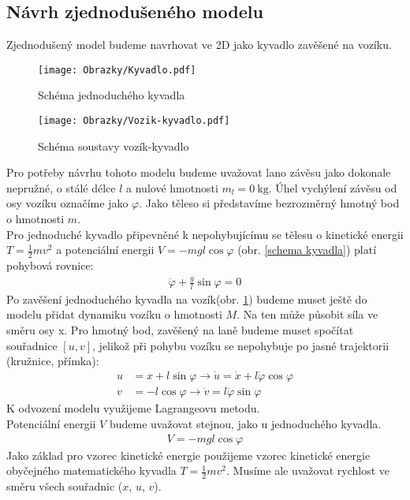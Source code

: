 \documentclass[a4paper, 12pt]{article}
\begin{document}
		\subsection{Návrh zjednodušeného modelu}		
			Zjednodušený model budeme navrhovat ve 2D jako kyvadlo zavěšené na vozíku.
			\begin{wrapfigure}{r}{0pt}
				\texttt{[image: Obrazky/Kyvadlo.pdf]}
				\caption{Schéma jednoduchého kyvadla}
				\label{schema kyvadla}
				\texttt{[image: Obrazky/Vozik-kyvadlo.pdf]}
				\caption{Schéma soustavy vozík-kyvadlo}
				\label{schema vozik-kyvadlo}
			\end{wrapfigure}
			Pro potřeby návrhu tohoto modelu budeme uvažovat lano závěsu jako dokonale nepružné, o stálé délce $l$ a nulové hmotnosti $m_l = \SI{0}{\kilogram}$. Úhel vychýlení závěsu od osy vozíku označíme jako $\varphi$. Jako těleso si představíme bezrozměrný hmotný bod o hmotnosti $m$.\\
			Pro jednoduché kyvadlo připevněné k nepohybujícímu se tělesu o kinetické energii $T = \frac{1}{2}mv^2$ a potenciální energii $V = -mgl\cos\varphi$ (obr. \ref{schema kyvadla}) platí pohybová rovnice:
			\begin{align*}
				\ddot{\varphi}+\frac{g}{l}\sin\varphi=0
			\end{align*}
			Po zavěšení jednoduchého kyvadla na vozík(obr. \ref{schema vozik-kyvadlo}) budeme muset ještě do modelu přidat dynamiku vozíku o hmotnosti $M$. Na ten může působit síla ve směru osy x. Pro hmotný bod, zavěšený na laně budeme muset spočítat souřadnice $\left[u, v\right]$, jelikož při pohybu vozíku se nepohybuje po jasné trajektorii (kružnice, přímka):
			\begin{align*}
				u &= x + l\sin\varphi \rightarrow \dot{u} = \dot{x}+l\dot{\varphi}\cos\varphi\\
				v &= -l\cos\varphi \rightarrow \dot{v} = l\dot{\varphi}\sin\varphi
			\end{align*} 
			K odvození modelu využijeme Lagrangeovu metodu.\\
			Potenciální energii $V$ budeme uvažovat stejnou, jako u jednoduchého kyvadla.
			\begin{align*}
				V = -mgl\cos{\varphi}
			\end{align*}
			Jako základ pro vzorec kinetické energie použijeme vzorec kinetické energie obyčejného matematického kyvadla $T = \frac{1}{2}mv^2$. Musíme ale uvažovat rychlost ve směru všech souřadnic ($x$, $u$, $v$).
\end{document}
